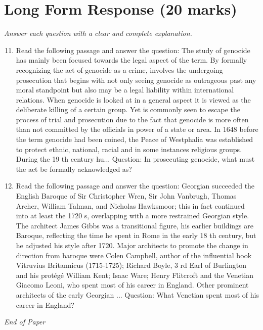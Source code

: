 \documentclass[12pt]{article}
\begin{document}
\section*{Long Form Response (20 marks)}
\textit{Answer each question with a clear and complete explanation.}
\begin{enumerate}[label=\arabic*.]
\setcounter{enumi}{10}
\item Read the following passage and answer the question: The study of genocide has mainly been focused towards the legal aspect of the term. By formally recognizing the act of genocide as a crime, involves the undergoing prosecution that begins with not only seeing genocide as outrageous past any moral standpoint but also may be a legal liability within international relations. When genocide is looked at in a general aspect it is viewed as the deliberate killing of a certain group. Yet is commonly seen to escape the process of trial and prosecution due to the fact that genocide is more often than not committed by the officials in power of a state or area. In 1648 before the term genocide had been coined, the Peace of Westphalia was established to protect ethnic, national, racial and in some instances religious groups. During the 19 th century hu... Question: In prosecuting genocide, what must the act be formally acknowledged as?
\item Read the following passage and answer the question: Georgian succeeded the English Baroque of Sir Christopher Wren, Sir John Vanbrugh, Thomas Archer, William Talman, and Nicholas Hawksmoor; this in fact continued into at least the 1720 s, overlapping with a more restrained Georgian style. The architect James Gibbs was a transitional figure, his earlier buildings are Baroque, reflecting the time he spent in Rome in the early 18 th century, but he adjusted his style after 1720. Major architects to promote the change in direction from baroque were Colen Campbell, author of the influential book Vitruvius Britannicus (1715-1725); Richard Boyle, 3 rd Earl of Burlington and his protégé William Kent; Isaac Ware; Henry Flitcroft and the Venetian Giacomo Leoni, who spent most of his career in England. Other prominent architects of the early Georgian ... Question: What Venetian spent most of his career in England?
\end{enumerate}

\vfill
\noindent\textit{End of Paper}
\end{document}
